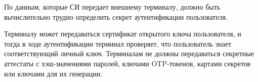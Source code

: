 \label{R.AP.Term2}
По данным, которые СИ передает внешнему терминалу, должно быть вычислительно 
трудно определить секрет аутентификации пользователя.
 
\begin{note*}
Терминалу может передаваться сертификат открытого ключа пользователя,
и тогда в ходе аутентификации терминал проверяет, что пользователь 
знает соответствующий личный ключ. Терминалам не должны передаваться 
секретные аттестаты с хэш-значениями паролей, ключами OTP-токенов, картами 
секретов или ключами для их генерации.
\end{note*}


%
%
